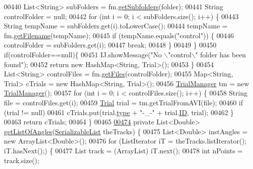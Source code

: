 \begin{DoxyCode}
{00440     List<String> subFolders = fm.\hyperlink{classfunctions_1_1_file_manager_a73efd872c86ccdce535ddb2798aaaea4}{getSubfolders}(folder);
00441     String controlFolder = null;
00442     \textcolor{keywordflow}{for} (\textcolor{keywordtype}{int} i = 0; i < subFolders.size(); i++) \{
00443       String tempName = subFolders.get(i).toLowerCase();
00444       tempName = fm.\hyperlink{classfunctions_1_1_file_manager_ad027758f34214960a7aa800e0f7c19db}{getFilename}(tempName);
00445       \textcolor{keywordflow}{if} (tempName.equals(\textcolor{stringliteral}{"control"})) \{
00446         controlFolder = subFolders.get(i);
00447         \textcolor{keywordflow}{break};
00448       \}
00449     \}
00450     \textcolor{keywordflow}{if}(controlFolder==null)\{
00451       IJ.showMessage(\textcolor{stringliteral}{"No \(\backslash\)"control\(\backslash\)" folder has been found"});
00452       \textcolor{keywordflow}{return} \textcolor{keyword}{new} HashMap<String, Trial>();
00453     \}
00454     List<String> controlFiles = fm.\hyperlink{classfunctions_1_1_file_manager_a3a54a5574abfddd928b2b8675e8affa6}{getFiles}(controlFolder);
00455     Map<String, Trial> cTrials = \textcolor{keyword}{new} HashMap<String, Trial>();
00456     \hyperlink{classfunctions_1_1_trial_manager}{TrialManager} tm = \textcolor{keyword}{new} \hyperlink{classfunctions_1_1_trial_manager}{TrialManager}();
00457     \textcolor{keywordflow}{for} (\textcolor{keywordtype}{int} i = 0; i < controlFiles.size(); i++) \{
00458       String file = controlFiles.get(i);
00459       \hyperlink{classdata_1_1_trial}{Trial} trial = tm.getTrialFromAVI(file);
00460       \textcolor{keywordflow}{if} (trial != null)
00461         cTrials.put(trial.\hyperlink{classdata_1_1_trial_a0b86e44425dbe3c9d866aa273f87828a}{type} + \textcolor{stringliteral}{"-\_-"} + trial.\hyperlink{classdata_1_1_trial_a317298c3409575f71e43acd3f73ce295}{ID}, trial);
00462     \}
00463     \textcolor{keywordflow}{return} cTrials;
00464   \}
00465 
\hypertarget{_chemotaxis_8java_source_l00474}{}\hyperlink{classanalysis_1_1_chemotaxis_a0a5886ad5b1d3a1dee18ed4fe5da7ed8}{00474}   \textcolor{keyword}{private} List<Double> \hyperlink{classanalysis_1_1_chemotaxis_a0a5886ad5b1d3a1dee18ed4fe5da7ed8}{getListOfAngles}(\hyperlink{classdata_1_1_serializable_list}{SerializableList} theTracks) \{
00475     List<Double> instAngles = \textcolor{keyword}{new} ArrayList<Double>();
00476     \textcolor{keywordflow}{for} (ListIterator iT = theTracks.listIterator(); iT.hasNext();) \{
00477       List track = (ArrayList) iT.next();
00478       \textcolor{keywordtype}{int} nPoints = track.size();
}
\end{DoxyCode}
